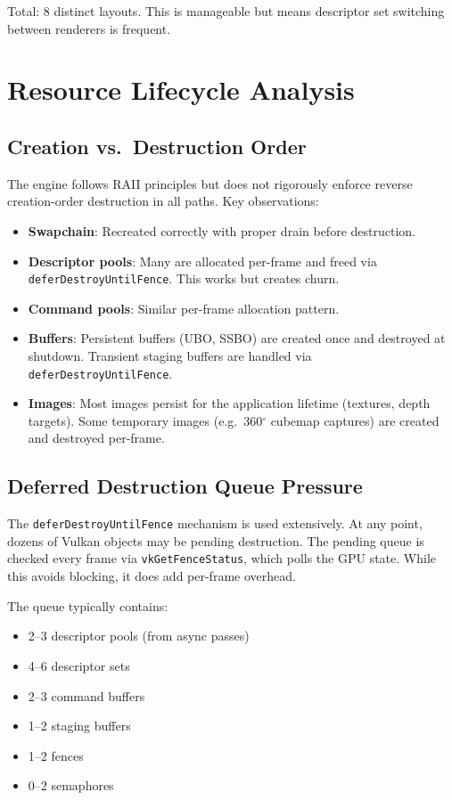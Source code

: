 \documentclass[a4paper,10pt]{article}
\newcommand{\degree}{\ensuremath{^\circ}}
\begin{document}
Total: 8 distinct layouts. This is manageable but means descriptor set
switching between renderers is frequent.

\section{Resource Lifecycle Analysis}

\subsection{Creation vs.\ Destruction Order}

The engine follows RAII principles but does not rigorously enforce reverse
creation-order destruction in all paths. Key observations:

\begin{itemize}[nosep]
    \item \textbf{Swapchain}: Recreated correctly with proper drain before
          destruction.
    \item \textbf{Descriptor pools}: Many are allocated per-frame and freed
          via \texttt{deferDestroyUntilFence}. This works but creates churn.
    \item \textbf{Command pools}: Similar per-frame allocation pattern.
    \item \textbf{Buffers}: Persistent buffers (UBO, SSBO) are created once
          and destroyed at shutdown. Transient staging buffers are handled
          via \texttt{deferDestroyUntilFence}.
    \item \textbf{Images}: Most images persist for the application lifetime
          (textures, depth targets). Some temporary images (e.g.\ 360\degree
          cubemap captures) are created and destroyed per-frame.
\end{itemize}

\subsection{Deferred Destruction Queue Pressure}

The \texttt{deferDestroyUntilFence} mechanism is used extensively. At any
point, dozens of Vulkan objects may be pending destruction. The pending
queue is checked every frame via \texttt{vkGetFenceStatus}, which polls the
GPU state. While this avoids blocking, it does add per-frame overhead.

The queue typically contains:
\begin{itemize}[nosep]
    \item 2--3 descriptor pools (from async passes)
    \item 4--6 descriptor sets
    \item 2--3 command buffers
    \item 1--2 staging buffers
    \item 1--2 fences
    \item 0--2 semaphores
\end{itemize}
\end{document}
